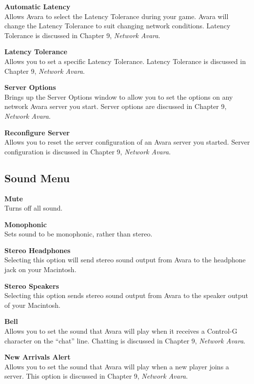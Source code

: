 \documentclass{article}
\begin{document}
\textbf{Automatic Latency\hspace{1em}}\\
Allows Avara to select the Latency Tolerance during your game. Avara will change the Latency Tolerance to suit changing network conditions. Latency Tolerance is discussed in Chapter 9, \textit{Network Avara}.

\textbf{Latency Tolerance}\\
Allows you to set a specific Latency Tolerance. Latency Tolerance is discussed in Chapter 9, \textit{Network Avara}.

\textbf{Server Options\hspace{1em}}\\
Brings up the Server Options window to allow you to set the options on any network Avara server you start. Server options are discussed in Chapter 9, \textit{Network Avara}.

\textbf{Reconfigure Server}\\
Allows you to reset the server configuration of an Avara server you started. Server configuration is discussed in Chapter 9, \textit{Network Avara}.

\subsection{Sound Menu}
\textbf{Mute}\\
Turns off all sound.

\textbf{Monophonic}\\
Sets sound to be monophonic, rather than stereo.

\textbf{Stereo Headphones}\\
Selecting this option will send stereo sound output from Avara to the headphone jack on your Macintosh.

\textbf{Stereo Speakers}\\
Selecting this option sends stereo sound output from Avara to the speaker output of your Macintosh.

\textbf{Bell\hspace{1em}}\\
Allows you to set the sound that Avara will play when it receives a Control-G character on the ``chat'' line. Chatting is discussed in Chapter 9, \textit{Network Avara}.

\textbf{New Arrivals Alert}\\
Allows you to set the sound that Avara will play when a new player joins a server. This option is discussed in Chapter 9, \textit{Network Avara}.
\end{document}
